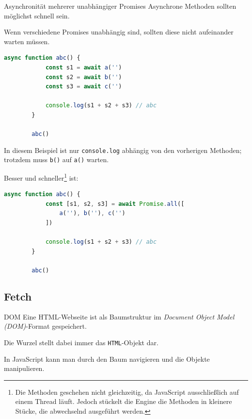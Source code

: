 \begin{bonus}{Asynchronität mehrerer unabhängiger Promises}
    Asynchrone Methoden sollten möglichst schnell sein.

    Wenn verschiedene Promises unabhängig sind, sollten diese nicht aufeinander warten müssen.

    \begin{lstlisting}[language=JavaScript]
        async function abc() {
            const s1 = await a('')
            const s2 = await b('')
            const s3 = await c('')

            console.log(s1 + s2 + s3) // abc
        }

        abc()
    \end{lstlisting}
    In diesem Beispiel ist nur \texttt{console.log} abhängig von den vorherigen Methoden; trotzdem muss \texttt{b()} auf \texttt{a()} warten.

    Besser und schneller\footnote{
        Die Methoden geschehen nicht gleichzeitig, da JavaScript ausschließlich auf einem Thread läuft.
        Jedoch stückelt die Engine die Methoden in kleinere Stücke, die abwechselnd ausgeführt werden.
    } ist:
    \begin{lstlisting}[language=JavaScript]
        async function abc() {
            const [s1, s2, s3] = await Promise.all([
                a(''), b(''), c('')
            ])

            console.log(s1 + s2 + s3) // abc
        }

        abc()
    \end{lstlisting}
\end{bonus}

\subsection{Fetch}

\begin{defi}{DOM}
    Eine HTML-Webseite ist als Baumstruktur im \emph{Document Object Model (DOM)}-Format gespeichert.

    Die Wurzel stellt dabei immer das \texttt{HTML}-Objekt dar.

    In JavaScript kann man durch den Baum navigieren und die Objekte manipulieren.
\end{defi}

